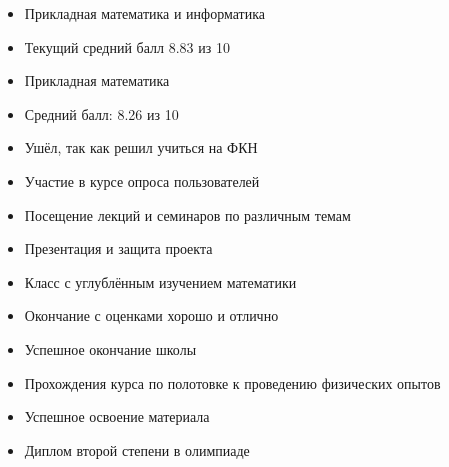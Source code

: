 \documentclass[10pt,a4paper,ragged2e]{maltacv}
\begin{document}
\medskip
\begin{multicols}{2}

  \begin{itemize}
      \item Прикладная математика и информатика
      \item Текущий средний балл 8.83 из 10
  \end{itemize}


  \begin{itemize}
      \item Прикладная математика
      \item Средний балл: 8.26 из 10
      \item Ушёл, так как решил учиться на ФКН
  \end{itemize}
  
  
  \begin{itemize}
      \item Участие в курсе опроса пользователей
      \item Посещение лекций и семинаров по различным темам
      \item Презентация и защита проекта
  \end{itemize}
    \columnbreak


  \begin{itemize}
      \item Класс с углублённым изучением математики
      \item Окончание с оценками хорошо и отлично
  \end{itemize}

  \begin{itemize}
        \item Успешное окончание школы
        \item Прохождения курса по полотовке к проведению физических опытов 
  \end{itemize}
  
  \begin{itemize}
        \item Успешное освоение материала
        \item Диплом второй степени в олимпиаде
  \end{itemize}
  
  
\end{multicols}
\end{document}
